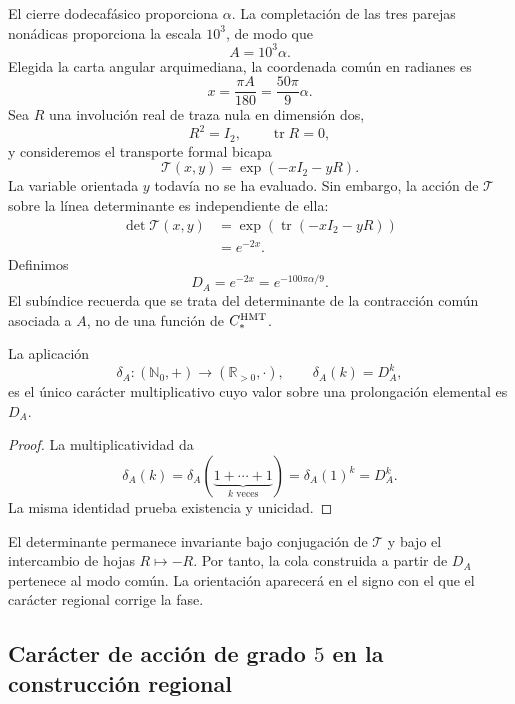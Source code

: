 
El cierre dodecafásico proporciona \(\alpha\). La completación de las tres
parejas nonádicas proporciona la escala \(10^3\), de modo que
\[
A=10^3\alpha.
\]
Elegida la carta angular arquimediana, la coordenada común en radianes es
\[
x=\frac{\pi A}{180}=\frac{50\pi}{9}\alpha.
\]
Sea \(R\) una involución real de traza nula en dimensión dos,
\[
R^2=I_2,
\qquad
\operatorname{tr}R=0,
\]
y consideremos el transporte formal bicapa
\[
\mathcal T(x,y)=\exp(-xI_2-yR).
\]
La variable orientada \(y\) todavía no se ha evaluado. Sin embargo, la acción
de \(\mathcal T\) sobre la línea determinante es independiente de ella:
\[
\begin{aligned}
\det\mathcal T(x,y)
&=\exp\!\left(\operatorname{tr}(-xI_2-yR)\right)\\
&=e^{-2x}.
\end{aligned}
\]
Definimos
\[
\boxed{
D_A=e^{-2x}=e^{-100\pi\alpha/9}.}
\]
El subíndice recuerda que se trata del determinante de la contracción común
asociada a \(A\), no de una función de \(C_*^{\rm HMT}\).

\begin{proposition}
\label{p3-83-c30-s1:prop:caracter-determinante}
La aplicación
\[
\delta_A:(\mathbb N_0,+)\longrightarrow(\mathbb R_{>0},\cdot),
\qquad
\delta_A(k)=D_A^k,
\]
es el único carácter multiplicativo cuyo valor sobre una prolongación
elemental es \(D_A\).
\end{proposition}

\begin{proof}
La multiplicatividad da
\[
\delta_A(k)
=\delta_A(\underbrace{1+\cdots+1}_{k\text{ veces}})
=\delta_A(1)^k=D_A^k.
\]
La misma identidad prueba existencia y unicidad.
\end{proof}

El determinante permanece invariante bajo conjugación de
\(\mathcal T\) y bajo el intercambio de hojas \(R\mapsto-R\). Por tanto, la
cola construida a partir de \(D_A\) pertenece al modo común. La orientación
aparecerá en el signo con el que el carácter regional corrige la fase.

\subsection{Carácter de acción de grado \texorpdfstring{\(5\)}{5} en la construcción regional}
\label{sec:s102:c38:3:2}

